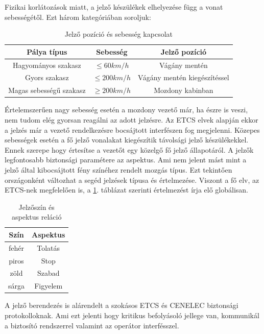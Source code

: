 \documentclass[a4paper,12pt]{article}
\begin{document}
Fizikai korlátozások miatt, a jelző készülékek elhelyezése függ a vonat sebességétől.
Ezt három kategóriában soroljuk:
\begin{table}[!htbp]
    \centering
    \begin{tabular}{ |c|c|c| } \hline
        Pálya típus & Sebesség & Jelző pozíció \\ \hline
        Hagyományos szakasz & $\leq 60 km/h$ & Vágány mentén \\ \hline
        Gyors szakasz & $ \leq 200 km/h $ & Vágány mentén kiegészítéssel \\ \hline
        Magas sebességű szakasz & $ \geq 200 km/h $ & Mozdony kabinban\\ \hline
    \end{tabular}
    \caption[Jelző pozíció és sebesség]{Jelző pozíció és sebesség kapcsolat}
\end{table}
Értelemszerűen nagy sebesség esetén a mozdony vezető már, ha észre is veszi, nem tudom elég gyorsan reagálni az adott jelzésre.
Az ETCS elvek alapján ekkor a jelzés már a vezető rendelkezésre bocsájtott interfészen fog megjelenni.
Közepes sebességek esetén a fő jelző vonalakat kiegészítik távolsági jelző készülékekkel. 
Ennek szerepe hogy értesítse a vezetőt egy közelgő fő jelző állapotáról.
A jelzők legfontosabb biztonsági paramétere az aspektus. Ami nem jelent mást mint a jelző által kibocsájtott fény színéhez rendelt mozgás típus.
Ezt tekintően országonként változhat a segéd jelzések típusa és értelmezése.
Viszont a fő elv, az ETCS-nek megfelelően is, a \ref{tab:aspectandcolor}. táblázat szerinti értelmezést írja elő globálisan.

\begin{table}[!htbp]
    \centering
	\begin{tabular}{ |c|c| } \hline
		Szín & Aspektus \\ \hline
		fehér \cellcolor{white} & Tolatás \\ \hline
		piros \cellcolor{red} & Stop \\ \hline
		zöld \cellcolor{green} & Szabad \\ \hline
		sárga \cellcolor{yellow} & Figyelem \\ \hline
	\end{tabular}
	\caption[Jelzőszín és aspektus reláció]{Jelzőszín és aspektus reláció}
	\label{tab:aspectandcolor}
\end{table}
A jelző berendezés is alárendelt a szokásos ETCS és CENELEC biztonsági protokolloknak.
Ami ezt jelenti hogy kritikus befolyásoló jellege van, kommunikál a biztosító rendszerrel valamint az operátor interfésszel.
\end{document}
